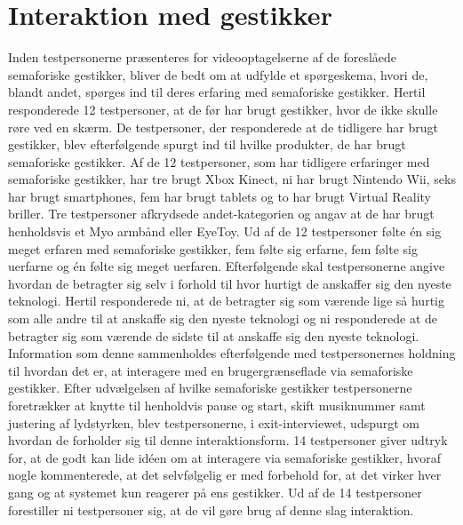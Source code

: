 \section{Interaktion med gestikker}
\label{TestresultaterInteraktioner}
%
Inden testpersonerne præsenteres for videooptagelserne af de foreslåede semaforiske gestikker, bliver de bedt om at udfylde et spørgeskema, hvori de, blandt andet, spørges ind til deres erfaring med semaforiske gestikker. Hertil responderede 12 testpersoner, at de før har brugt gestikker, hvor de ikke skulle røre ved en skærm. De testpersoner, der responderede at de tidligere har brugt gestikker, blev efterfølgende spurgt ind til hvilke produkter, de har brugt semaforiske gestikker. Af de 12 testpersoner, som har tidligere erfaringer med semaforiske gestikker, har tre brugt Xbox Kinect, ni har brugt Nintendo Wii, seks har brugt smartphones, fem har brugt tablets og to har brugt Virtual Reality briller. Tre testpersoner afkrydsede andet-kategorien og angav at de har brugt henholdsvis et Myo armbånd eller EyeToy. Ud af de 12 testpersoner følte én sig meget erfaren med semaforiske gestikker, fem følte sig erfarne, fem følte sig uerfarne og én følte sig meget uerfaren. Efterfølgende skal testpersonerne angive hvordan de betragter sig selv i forhold til hvor hurtigt de anskaffer sig den nyeste teknologi. Hertil responderede ni, at de betragter sig som værende lige så hurtig som alle andre til at anskaffe sig den nyeste teknologi og ni responderede at de betragter sig som værende de sidste til at anskaffe sig den nyeste teknologi. Information som denne sammenholdes efterfølgende med testpersonernes holdning til hvordan det er, at interagere med en brugergrænseflade via semaforiske gestikker.\blankline
%
Efter udvælgelsen af hvilke semaforiske gestikker testpersonerne foretrækker at knytte til henholdvis pause og start, skift musiknummer samt justering af lydstyrken, blev testpersonerne, i exit-interviewet, udspurgt om hvordan de forholder sig til denne interaktionsform. 14 testpersoner giver udtryk for, at de godt kan lide idéen om at interagere via semaforiske gestikker, hvoraf nogle kommenterede, at det selvfølgelig er med forbehold for, at det virker hver gang og at systemet kun reagerer på ens gestikker. Ud af de 14 testpersoner forestiller ni testpersoner sig, at de vil gøre brug af denne slag interaktion.

